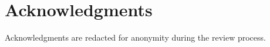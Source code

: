 \documentclass{sig-alternate}
\begin{document}
\section{Acknowledgments}
Acknowledgments are redacted for anonymity during the review process.



%

\end{document}
